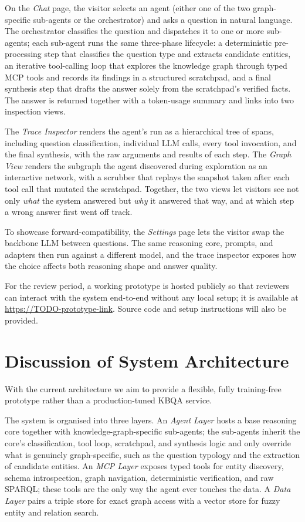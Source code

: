 \documentclass[sigconf,natbib=true]{ceurart}
\begin{document}
On the \emph{Chat} page, the visitor selects an agent (either one of
the two graph-specific sub-agents or the orchestrator) and asks a
question in natural language. The orchestrator classifies the question
and dispatches it to one or more sub-agents; each sub-agent runs the
same three-phase lifecycle: a deterministic pre-processing step that
classifies the question type and extracts candidate entities, an
iterative tool-calling loop that explores the knowledge graph through
typed MCP tools and records its findings in a structured scratchpad,
and a final synthesis step that drafts the answer solely from the
scratchpad's verified facts. The answer is returned together with a
token-usage summary and links into two inspection views.

The \emph{Trace Inspector} renders the agent's run as a hierarchical
tree of spans, including question classification, individual LLM
calls, every tool invocation, and the final synthesis, with the raw
arguments and results of each step. The \emph{Graph View} renders the
subgraph the agent discovered during exploration as an interactive
network, with a scrubber that replays the snapshot taken after each
tool call that mutated the scratchpad. Together, the two views let
visitors see not only \emph{what} the system answered but \emph{why}
it answered that way, and at which step a wrong answer first went off
track.

To showcase forward-compatibility, the \emph{Settings} page lets the
visitor swap the backbone LLM between questions. The same reasoning
core, prompts, and adapters then run against a different model, and
the trace inspector exposes how the choice affects both reasoning
shape and answer quality.

For the review period, a working prototype is hosted publicly so that
reviewers can interact with the system end-to-end without any local
setup; it is available at \url{https://TODO-prototype-link}.
Source code and setup instructions will also be provided.

\section{Discussion of System Architecture}

With the current architecture we aim to provide a flexible, fully
training-free prototype rather than a production-tuned KBQA service.

The system is organised into three layers. An \emph{Agent Layer}
hosts a base reasoning core together with knowledge-graph-specific
sub-agents; the sub-agents inherit the core's classification, tool
loop, scratchpad, and synthesis logic and only override what is
genuinely graph-specific, such as the question typology and the
extraction of candidate entities. An \emph{MCP Layer} exposes typed
tools for entity discovery, schema introspection, graph navigation,
deterministic verification, and raw SPARQL; these tools are the only
way the agent ever touches the data. A \emph{Data Layer} pairs a
triple store for exact graph access with a vector store for fuzzy
entity and relation search.
\end{document}
